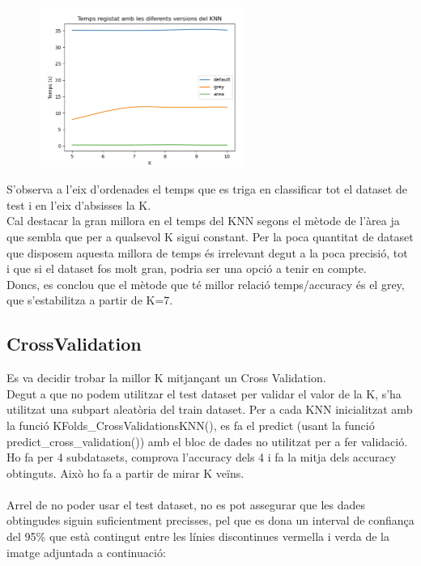 \documentclass[a4paper, 11pt]{article}
\begin{document}
\begin{figure}[h]
  \begin{center}
    \includegraphics[width=0.6\textwidth]{comparacio_temps_knn.PNG}
  \end{center}
\end{figure}
S’observa a l’eix d’ordenades el temps que es triga en classificar tot el dataset de test i en l’eix d’absisses la K.\\
Cal destacar la gran millora en el temps del KNN segons el mètode de l’àrea ja que sembla que per a qualsevol K sigui constant. Per la poca quantitat de dataset que disposem aquesta millora de temps és irrelevant degut a la poca precisió, tot i que si el dataset fos molt gran, podria ser una opció a tenir en compte. \\
Doncs, es conclou que el mètode que té millor relació temps/accuracy és el grey, que s’estabilitza a partir de K=7.


\newpage
\subsection{CrossValidation}\label{crossvalidation}
Es va decidir trobar la millor K mitjançant un Cross Validation.\\
Degut a que no podem utilitzar el test dataset per validar el valor de la K, s'ha utilitzat una subpart aleatòria del train dataset. Per a cada KNN inicialitzat amb la funció \textcolor{funcblue}{KFolds\_CrossValidationsKNN()}, es fa el predict (usant la funció \textcolor{funcblue}{predict\_cross\_validation()}) amb el bloc de dades no utilitzat per a fer validació. Ho fa per 4 subdatasets, comprova l’accuracy dels 4 i fa la mitja dels accuracy obtinguts. Això ho fa a partir de mirar K veïns. \\\\
Arrel de no poder usar el test dataset, no es pot assegurar que les dades obtingudes siguin suficientment precisses, pel que es dona un interval de confiança del 95\% que està contingut entre les línies discontinues vermella i verda de la imatge adjuntada a continuació:
\end{document}
